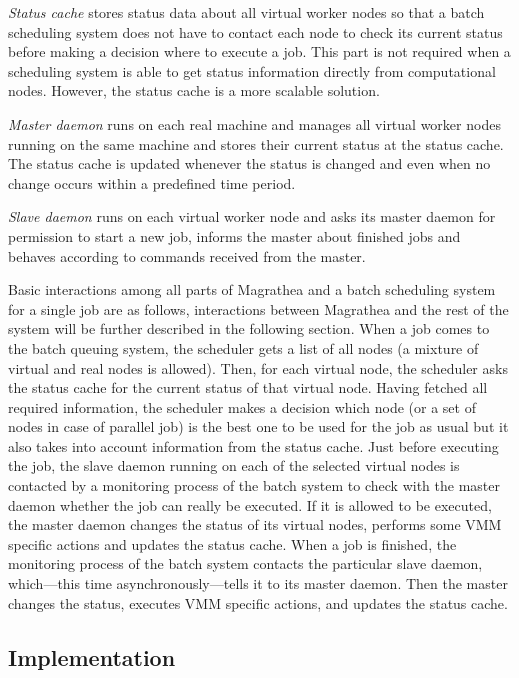 \documentclass{sigplanconf}
\begin{document}
\textit{Status cache} stores status data about all virtual worker nodes so
that a batch scheduling system does not have to contact each node to check its
current status before making a decision where to execute a job. This part is
not required when a scheduling system is able to get status information
directly from computational nodes. However, the status cache is a more
scalable solution.

\textit{Master daemon} runs on each real machine and manages all virtual
worker nodes running on the same machine and stores their current status at
the status cache. The status cache is updated whenever the status is changed
and even when no change occurs within a predefined time period.

\textit{Slave daemon} runs on each virtual worker node and asks its master
daemon for permission to start a new job, informs the master about finished
jobs and behaves according to commands received from the master.

Basic interactions among all parts of Magrathea and a batch scheduling system
for a single job are as follows, interactions between Magrathea and the rest
of the system will be further described in the following section. When a job
comes to the batch queuing system, the scheduler gets a list of all nodes (a
mixture of virtual and real nodes is allowed). Then, for each virtual node,
the scheduler asks the status cache for the current status of that virtual
node. Having fetched all required information, the scheduler makes a decision
which node (or a set of nodes in case of parallel job) is the best one to be
used for the job as usual but it also takes into account information from the
status cache. Just before executing the job, the slave daemon running on each
of the selected virtual nodes is contacted by a monitoring process of the
batch system to check with the master daemon whether the job can really be
executed. If it is allowed to be executed, the master daemon changes the
status of its virtual nodes, performs some VMM specific actions and updates
the status cache. When a job is finished, the monitoring process of the batch
system contacts the particular slave daemon, which---this time
asynchronously---tells it to its master daemon. Then the master changes the
status, executes VMM specific actions, and updates the status cache.

\subsection{Implementation}
\end{document}
